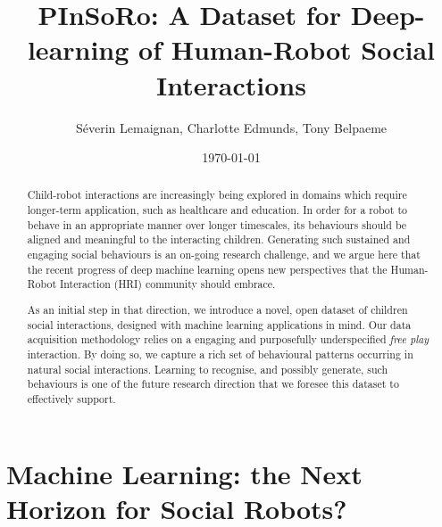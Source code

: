 \documentclass{article}
\title{PInSoRo: A Dataset for Deep-learning of Human-Robot Social Interactions}
\author{Séverin Lemaignan, Charlotte Edmunds, Tony Belpaeme}
\date{\today}
\begin{document}
\maketitle

\begin{abstract}


Child-robot interactions are increasingly being explored in domains which
require longer-term application, such as healthcare and education. In order
for a robot to behave in an appropriate manner over longer timescales, its
behaviours should be aligned and meaningful to the interacting children.
Generating such sustained and engaging social behaviours is an on-going research
challenge, and we argue here that the recent progress of deep machine learning
opens new perspectives that the Human-Robot Interaction (HRI) community
should embrace.

As an initial step in that direction, we introduce a novel,
open dataset of children social interactions, designed with
machine learning applications in mind. Our data acquisition methodology relies on
a engaging and purposefully underspecified \emph{free play} interaction. By doing
so, we capture a rich set of behavioural patterns occurring in natural
social interactions. Learning to recognise, and possibly generate, such
behaviours is one of the future research direction that we foresee this dataset to effectively support.


\end{abstract}

\section{Machine Learning: the Next Horizon for Social Robots?}
\end{document}
